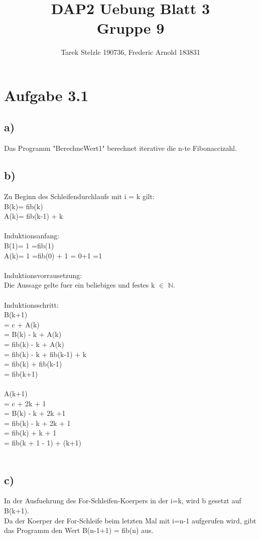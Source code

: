 \documentclass{article}
\title{DAP2 Uebung Blatt 3\\Gruppe 9}
\author{Tarek Stelzle 190736, Frederic Arnold 183831}
\begin{document}
\maketitle

\section*{Aufgabe 3.1}

\subsection*{a)}
Das Programm "BerechneWert1" berechnet iterative die n-te Fibonaccizahl.

\subsection*{b)}
Zu Beginn des Schleifendurchlaufs mit i = k gilt:\\
B(k)= fib(k)\\
A(k)= fib(k-1) + k\\
\\
Induktionsanfang:\\
B(1)= 1 =fib(1)\\
A(k)= 1 =fib(0) + 1 = 0+1 =1\\
\\
Induktionsvorrausetzung:\\
Die Aussage gelte fuer ein beliebiges und festes k $\in$ $\mathbb{N}$.\\
\\
Induktionsschritt:\\
B(k+1)\\
= c + A(k)\\
= B(k) - k + A(k)\\
= fib(k) - k + A(k)\\
= fib(k) - k + fib(k-1) + k\\
= fib(k) + fib(k-1)\\
= fib(k+1)\\
\\
A(k+1)\\
= c + 2k + 1\\
= B(k) - k + 2k +1\\
= fib(k) - k + 2k + 1\\
= fib(k) + k + 1\\
= fib(k + 1 - 1) + (k+1)\\
\\
\subsection*{c)}
In der Ausfuehrung des For-Schleifen-Koerpers in der i=k, wird b gesetzt auf B(k+1).\\
Da der Koerper der For-Schleife beim letzten Mal mit i=n-1 aufgerufen wird, gibt das Programm den Wert B(n-1+1) = fib(n) aus.\\
\\
\end{document}
